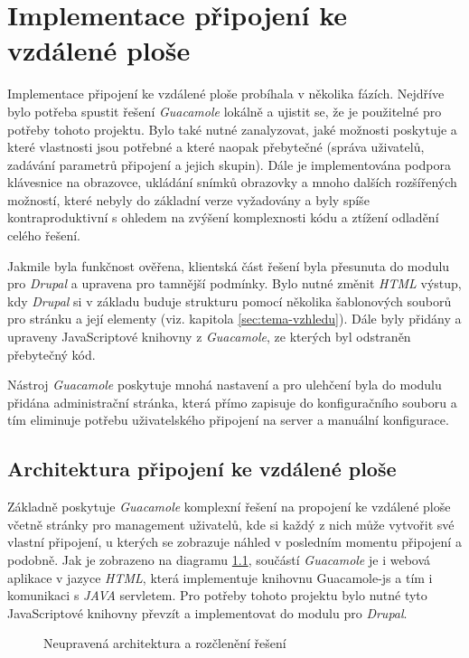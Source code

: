 \chapter{Implementace připojení ke vzdálené ploše}
\label{chap:implementace-guacamole}
Implementace připojení ke vzdálené ploše probíhala v několika fázích. Nejdříve bylo potřeba spustit řešení \emph{Guacamole} lokálně a ujistit se, že je použitelné pro potřeby tohoto projektu. Bylo také nutné zanalyzovat, jaké možnosti poskytuje a které vlastnosti jsou potřebné a které naopak přebytečné (správa uživatelů, zadávání parametrů připojení a jejich skupin). Dále je implementována podpora klávesnice na obrazovce, ukládání snímků obrazovky a mnoho dalších rozšířených možností, které nebyly do základní verze vyžadovány a byly spíše kontraproduktivní s ohledem na zvýšení komplexnosti kódu a ztížení odladění celého řešení. 

Jakmile byla funkčnost ověřena, klientská část řešení byla přesunuta do modulu pro \emph{Drupal} a upravena pro tamnější podmínky. Bylo nutné změnit \emph{HTML} výstup, kdy \emph{Drupal} si v základu buduje strukturu pomocí několika šablonových souborů pro stránku a její elementy (viz. kapitola \ref{sec:tema-vzhledu}). Dále byly přidány a upraveny JavaScriptové knihovny z \emph{Guacamole}, ze kterých byl odstraněn přebytečný kód. 

Nástroj \emph{Guacamole} poskytuje mnohá nastavení a pro ulehčení byla do modulu přidána administrační stránka, která přímo zapisuje do konfiguračního souboru a tím eliminuje potřebu uživatelského připojení na server a manuální konfigurace. 

\section{Architektura připojení ke vzdálené ploše}
Základně poskytuje \emph{Guacamole} komplexní řešení na propojení ke vzdálené ploše včetně stránky pro management uživatelů, kde si každý z nich může vytvořit své vlastní připojení, u kterých se zobrazuje náhled v posledním momentu připojení a podobně. Jak je zobrazeno na diagramu \ref{fig:arch_guacamole}, součástí \emph{Guacamole} je i webová aplikace v jazyce \emph{HTML}, která implementuje knihovnu Guacamole-js a tím i komunikaci s \emph{JAVA} \gls{servlet}em. Pro potřeby tohoto projektu bylo nutné tyto JavaScriptové knihovny převzít a implementovat do modulu pro \emph{Drupal}. 

\begin{figure}[htp] 
  \caption{Neupravená architektura a rozčlenění řešení}
  \label{fig:arch_guacamole}
\end{figure}  

